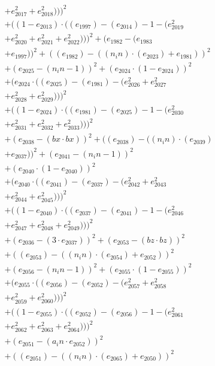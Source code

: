 \documentclass[10pt, a4paper]{article}
\begin{document}
\begin{small}
\begin{align*}
& + e_{2017}^{2} + e_{2018}^{2})))^{2} \\
& + ((1 - e_{2013})  \cdot  ((e_{1997}) - (e_{2014}) - 1 - (e_{2019}^{2} \\
& + e_{2020}^{2} + e_{2021}^{2} + e_{2022}^{2})))^{2} + (e_{1982} - (e_{1983} \\
& + e_{1997}))^{2} + ((e_{1982}) - ((n_in)  \cdot  (e_{2023}) + e_{1981}))^{2} \\
& + (e_{2025} - (n_in - 1))^{2} + (e_{2024}  \cdot  (1 - e_{2024}))^{2} \\
& + (e_{2024}  \cdot  ((e_{2025}) - (e_{1981}) - (e_{2026}^{2} + e_{2027}^{2} \\
& + e_{2028}^{2} + e_{2029}^{2})))^{2} \\
& + ((1 - e_{2024})  \cdot  ((e_{1981}) - (e_{2025}) - 1 - (e_{2030}^{2} \\
& + e_{2031}^{2} + e_{2032}^{2} + e_{2033}^{2})))^{2} \\
& + (e_{2038} - (bx  \cdot  bx))^{2} + ((e_{2038}) - ((n_in)  \cdot  (e_{2039}) \\
& + e_{2037}))^{2} + (e_{2041} - (n_in - 1))^{2} \\
& + (e_{2040}  \cdot  (1 - e_{2040}))^{2} \\
& + (e_{2040}  \cdot  ((e_{2041}) - (e_{2037}) - (e_{2042}^{2} + e_{2043}^{2} \\
& + e_{2044}^{2} + e_{2045}^{2})))^{2} \\
& + ((1 - e_{2040})  \cdot  ((e_{2037}) - (e_{2041}) - 1 - (e_{2046}^{2} \\
& + e_{2047}^{2} + e_{2048}^{2} + e_{2049}^{2})))^{2} \\
& + (e_{2036} - (3  \cdot  e_{2037}))^{2} + (e_{2053} - (bz  \cdot  bz))^{2} \\
& + ((e_{2053}) - ((n_in)  \cdot  (e_{2054}) + e_{2052}))^{2} \\
& + (e_{2056} - (n_in - 1))^{2} + (e_{2055}  \cdot  (1 - e_{2055}))^{2} \\
& + (e_{2055}  \cdot  ((e_{2056}) - (e_{2052}) - (e_{2057}^{2} + e_{2058}^{2} \\
& + e_{2059}^{2} + e_{2060}^{2})))^{2} \\
& + ((1 - e_{2055})  \cdot  ((e_{2052}) - (e_{2056}) - 1 - (e_{2061}^{2} \\
& + e_{2062}^{2} + e_{2063}^{2} + e_{2064}^{2})))^{2} \\
& + (e_{2051} - (a_in  \cdot  e_{2052}))^{2} \\
& + ((e_{2051}) - ((n_in)  \cdot  (e_{2065}) + e_{2050}))^{2} \\

\end{align*}
\end{small}
\end{document}
